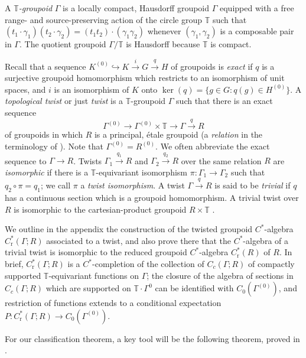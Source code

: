 \documentclass[12pt,a4paper]{amsart}
\newcommand{\field}[1]{\mathbb{#1}}
\newcommand{\TT}{\field{T}}
\newcommand{\red}{\operatorname{r}}
\newcommand{\tgcsa}[2]{\ensuremath{C^*_{\red}(#1 ; #2)}}
\begin{document}
\label{defn twist} A \emph{$\TT$-groupoid} $\Gamma$ is a
locally compact, Hausdorff groupoid $\Gamma$ equipped with a
free range- and source-preserving action of the circle group
$\TT$  such that $(t_1 \cdot \gamma_1)(t_2 \cdot \gamma_2) =
(t_1t_2) \cdot (\gamma_1\gamma_2)$ whenever
$(\gamma_1,\gamma_2)$ is a composable pair in $\Gamma$. The
quotient groupoid $\Gamma/\TT$ is  Hausdorff because $\TT$ is compact.

Recall that a sequence $K^{(0)} \hookrightarrow K
\stackrel{i}{\to} G \stackrel{q}{\to} H$ of groupoids is
\emph{exact} if $q$ is a surjective groupoid homomorphism which
restricts to an isomorphism of unit spaces, and $i$ is an
isomorphism of $K$ onto $\ker(q) = \{g \in G : q(g) \in
H^{(0)}\}$. A \emph{topological twist} or just \emph{twist} is a
$\TT$-groupoid $\Gamma$ such that there is an exact
sequence\label{pg-twist2}
\[
\Gamma^{(0)}\to\Gamma^{(0)} \times \TT \to \Gamma \stackrel{q}{\to} R
\]
of groupoids in which $R$ is a principal, \'etale groupoid (a
\emph{relation} in the terminology of \cite{Kumjian1986}). Note
that $\Gamma^{(0)}=R^{(0)}$. We often abbreviate the exact
sequence to $\Gamma\to R$. Twists $\Gamma_1 \stackrel{q_1}{\to}
R$ and $\Gamma_2 \stackrel{q_2}{\to} R$ over the same relation
$R$ are \emph{isomorphic} if there is a $\TT$-equivariant
isomorphism $\pi : \Gamma_1 \to \Gamma_2$ such that $q_2 \circ
\pi = q_1$; we call $\pi$ a \emph{twist isomorphism}. A twist
$\Gamma \stackrel{q}{\to} R$ is said to be
\emph{trivial}\label{pg:trivial} if $q$ has a continuous
section which is a groupoid homomorphism.  A trivial twist over
$R$ is isomorphic to the cartesian-product groupoid $R \times
\TT$ \cite[Remark~4.2]{Kumjian1986}.\label{pg:trivial twist}

We outline in the appendix the
construction of the twisted groupoid $C^*$-algebra
$\tgcsa{\Gamma}{R}$ associated to a twist, and also prove there
that the $C^*$-algebra of a trivial twist is isomorphic to the
reduced groupoid $C^*$-algebra $C^*_{\red}(R)$ of $R$. In brief,
$\tgcsa{\Gamma}{R}$ is a $C^*$-completion of the collection of
$C_c(\Gamma;R)$ of compactly supported $\TT$-equivariant
functions on $\Gamma$; the closure of the algebra of sections in
$C_c(\Gamma;R)$ which are supported on $\TT \cdot \Gamma^0$ can
be identified with $C_0(\Gamma^{(0)})$, and restriction of
functions extends to a conditional expectation $P :
\tgcsa{\Gamma}{R} \to C_0(\Gamma^{(0)})$\label{pg:tgcsa outline}.

For our classification theorem, a key tool will be the following
theorem, proved in \cite{Kumjian1986}.
\end{document}
